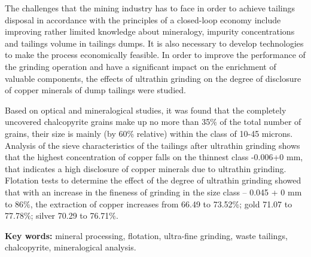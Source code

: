 The challenges that the mining industry has to face in order to achieve
tailings disposal in accordance with the principles of a closed-loop
economy include improving rather limited knowledge about mineralogy,
impurity concentrations and tailings volume in tailings dumps. It is
also necessary to develop technologies to make the process economically
feasible. In order to improve the performance of the grinding operation
and have a significant impact on the enrichment of valuable components,
the effects of ultrathin grinding on the degree of disclosure of copper
minerals of dump tailings were studied.

Based on optical and mineralogical studies, it was found that the
completely uncovered chalcopyrite grains make up no more than 35\% of
the total number of grains, their size is mainly (by 60\% relative)
within the class of 10-45 microns. Analysis of the sieve characteristics
of the tailings after ultrathin grinding shows that the highest
concentration of copper falls on the thinnest class -0.006+0 mm, that
indicates a high disclosure of copper minerals due to ultrathin
grinding. Flotation tests to determine the effect of the degree of
ultrathin grinding showed that with an increase in the fineness of
grinding in the size class -- 0.045 + 0 mm to 86\%, the extraction of
copper increases from 66.49 to 73.52\%; gold 71.07 to 77.78\%; silver
70.29 to 76.71\%.

{\bfseries Key words:} mineral processing, flotation, ultra-fine grinding,
waste tailings, chalcopyrite, mineralogical analysis.

